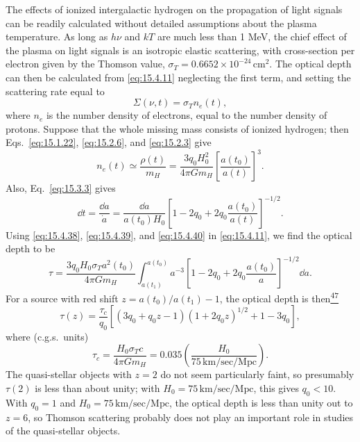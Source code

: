 The effects of ionized intergalactic hydrogen on the propagation of light
signals can be readily calculated without detailed assumptions about the plasma
temperature. As long as \(h\nu\) and \(kT\) are much less than 1 MeV, the chief
effect of the plasma on light signals is an isotropic elastic scattering, with
cross-section per electron given by the Thomson value,
\(\sigma_T=0.6652\times10^{-24}\,\mathrm{cm^2}\). The optical depth can then
be calculated from \eqref{eq:15.4.11} neglecting the first term, and setting
the scattering rate equal to
\begin{equation}
  \Sigma(\nu,t)=\sigma_Tn_e(t),
  \tag{15.4.38}\label{eq:15.4.38}
\end{equation}
where \(n_e\) is the number density of electrons, equal to the number density
of protons. Suppose that the whole missing mass consists of ionized hydrogen;
then Eqs.~\eqref{eq:15.1.22}, \eqref{eq:15.2.6}, and \eqref{eq:15.2.3}
give
\begin{equation}
  n_e(t)
  \simeq
  \frac{\rho(t)}{m_H}
  =
  \frac{3q_0H_0^2}{4\pi Gm_H}
  \left[\frac{a(t_0)}{a(t)}\right]^3.
  \tag{15.4.39}\label{eq:15.4.39}
\end{equation}
Also, Eq.~\eqref{eq:15.3.3} gives
\begin{equation}
  \dd t
  =
  \frac{\dd a}{\dot a}
  =
  \frac{\dd a}{a(t_0)H_0}
  \left[
    1-2q_0+2q_0\frac{a(t_0)}{a(t)}
  \right]^{-1/2}.
  \tag{15.4.40}\label{eq:15.4.40}
\end{equation}
Using \eqref{eq:15.4.38}, \eqref{eq:15.4.39}, and
\eqref{eq:15.4.40} in \eqref{eq:15.4.11}, we find the optical depth to be
\[
  \tau
  =
  \frac{3q_0H_0\sigma_Ta^2(t_0)}{4\pi Gm_H}
  \int_{a(t_1)}^{a(t_0)}
  a^{-3}
  \left[
    1-2q_0+2q_0\frac{a(t_0)}a
  \right]^{-1/2}\dd a.
\]
For a source with red shift \(z=a(t_0)/a(t_1)-1\), the optical depth is
then\hyperref[ch15-ref-47]{\textsuperscript{47}}
\begin{equation}
  \tau(z)
  =
  \frac{\tau_c}{q_0}
  \left[
    (3q_0+q_0z-1)(1+2q_0z)^{1/2}
    +1-3q_0
  \right],
  \tag{15.4.41}\label{eq:15.4.41}
\end{equation}
where (c.g.s.\ units)
\begin{equation}
  \tau_c
  =
  \frac{H_0\sigma_Tc}{4\pi Gm_H}
  =
  0.035
  \left(
    \frac{H_0}{75\,\mathrm{km/sec/Mpc}}
  \right).
  \tag{15.4.42}\label{eq:15.4.42}
\end{equation}
The quasi-stellar objects with \(z=2\) do not seem particularly faint, so
presumably \(\tau(2)\) is less than about unity; with
\(H_0=75\,\mathrm{km/sec/Mpc}\), this gives \(q_0<10\). With \(q_0=1\) and
\(H_0=75\,\mathrm{km/sec/Mpc}\), the optical depth is less than unity out to
\(z=6\), so Thomson scattering probably does not play an important role in
studies of the quasi-stellar objects.

